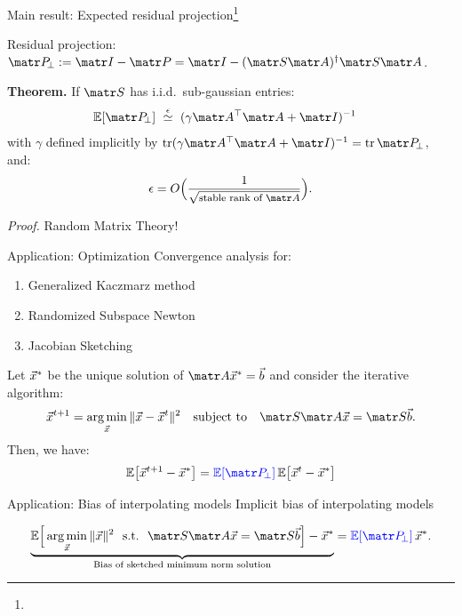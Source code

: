\begin{frame}{Main result: Expected residual projection\footnote{\tiny{}}}
    \vspace{5mm}
    
    Residual projection: $\P_{\!\perp} := \I - \P = \I -
    (\S\A)^\dagger\S\A$.

\textbf{Theorem.}  If $\S$ has i.i.d.~sub-gaussian entries:
\begin{align*}
    \E[\P_{\!\perp}]\
   &\overset\epsilon\simeq \ (\gamma\A^\top\A + \I)^{-1}
\end{align*}
with $\gamma$ defined implicitly by
$\tr (\gamma\A^\top\A + \I)^{-1}=\tr\P_{\!\perp}$, and:
\begin{align*}
  \epsilon = O\Big(\frac1{\sqrt{\text{\footnotesize stable rank of $\A$}}}\Big).
\end{align*}

\textit{Proof.}  Random Matrix Theory!

\end{frame}



\begin{frame}{Application: Optimization}
    Convergence analysis for:
  \begin{enumerate}
  \item Generalized Kaczmarz method \parencite{generalized-kaczmarz}
  \item Randomized Subspace Newton  \parencite{Gower2019}
  \item Jacobian Sketching \parencite{jacsketch}
  \end{enumerate}
  
  \pause

    Let $\vec{x}^*$
    be the unique solution of $\A\x^*=\b$ and consider
  the iterative algorithm:
  \begin{align*}
    \x^{t+1} = \argmin_{\x} \|\x-\x^t\|^2\quad\textnormal{subject to}\quad\S\A\x=\S\b.
  \end{align*}
Then, we have:
  \begin{align*}
    \E\big[\x^{t+1}-\x^*\big] =
    \Blue{\E[\P_{\!\perp}]}\,\E\big[\x^t-\x^*\big]
  \end{align*}
\end{frame}

\begin{subframe}{Application: Bias of interpolating models}
Implicit bias of interpolating models \parencite{surrogate-design}


\begin{align*}
  \underbrace{\E\Big[\argmin_{\x} \|\x\|^2\ \ \textnormal{s.t.}\ \
    \S\A\x=\S\b\Big] - \x^*}_{\text{Bias of sketched minimum norm
  solution}}
  = \Blue{\E[\P_{\!\perp}]}\,\x^*.
\end{align*}
\end{subframe}

